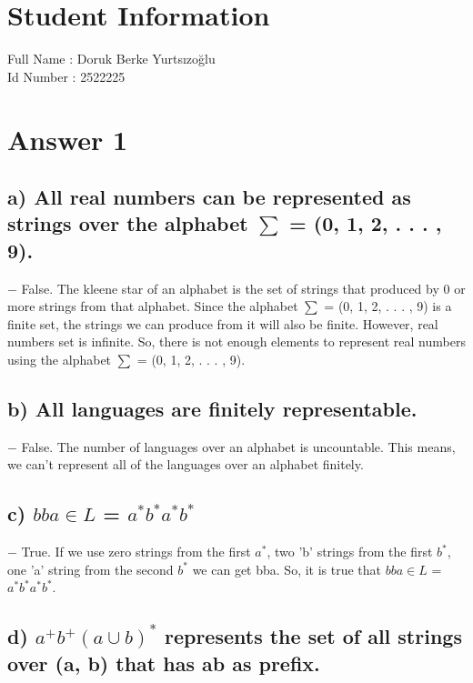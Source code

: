 \documentclass[12pt]{article}
\begin{document}
\section*{Student Information } 
Full Name :  Doruk Berke Yurtsızoğlu\\
Id Number :  2522225\\


\section*{Answer 1}

\subsection*{a) All real numbers can be represented as strings over the alphabet $\sum$ = (0, 1, 2, . . . , 9).} 

	$-$ False. The kleene star of an alphabet is the set of strings that produced by 0 or more strings from that alphabet. Since the alphabet $\sum$ = (0, 1, 2, . . . , 9) is a finite set, the strings we can produce from it will also be finite. However, real numbers set is infinite. So, there is not enough elements to represent real numbers using the alphabet $\sum$ = (0, 1, 2, . . . , 9).


\subsection*{b) All languages are finitely representable.}

	$-$ False. The number of languages over an alphabet is uncountable. This means, we can't represent all of the languages over an alphabet finitely. 


\subsection*{c) $bba \in L$ = $a^{*}b^{*}a^{*}b^{*}$}

	$-$ True. If we use zero strings from the first $a^{*}$, two 'b' strings from the first $b^{*}$, one 'a' string from the second $b^{*}$ we can get bba. So, it is true that $bba \in L$ = $a^{*}b^{*}a^{*}b^{*}$.

\subsection*{d) $a^{+}b^{+}(a \cup b)^{*}$ represents the set of all strings over (a, b) that has ab as prefix.}
\end{document}
